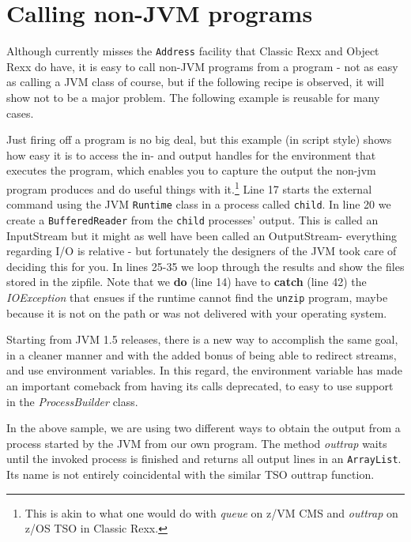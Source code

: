 {\chapter{Calling non-JVM programs}
Although \nr{} currently misses the \texttt{Address} facility that
Classic Rexx and Object Rexx do have, it is easy to call non-JVM programs
from a \nr{} program - not as easy as calling a JVM class of course, but if
the following recipe is observed, it will show not to be a major
problem. The following example is reusable for many cases.
 
Just firing off a program is no big deal, but this example (in script
style) shows how easy it is to access the in- and output handles for
the environment that executes the program, which enables you to
capture the output the non-jvm program produces and do useful things
with it.\footnote{This is akin to what one would do with \emph{queue}
  on z/VM CMS and \emph{outtrap} on z/OS TSO in Classic Rexx.}
Line 17 starts the external command using the JVM \texttt{Runtime}
class in a process called \texttt{child}. In line 20 we create a
\texttt{BufferedReader} from the \texttt{child} processes'
output. This is called an InputStream but it might as well have been
called an OutputStream- everything regarding I/O is relative - but
fortunately the designers of the JVM took care of deciding this for you.
In lines 25-35 we loop through the results and show the files stored
in the zipfile. Note that we \textbf{do} (line 14) have to \textbf{catch} (line
42) the \emph{IOException} that ensues if the runtime cannot find the
\texttt{unzip} program, maybe because it is not on the path or was not
delivered with your operating system. 



Starting from JVM 1.5 releases, there is a new way to accomplish the
same goal, in a cleaner manner and with the added bonus of being able
to redirect streams, and use environment variables. In this regard,
the environment variable has made an important comeback from having
its calls deprecated, to easy to use support in the
\emph{ProcessBuilder} class. 
 
In the above sample, we are using two different ways to obtain the
output from a process started by the JVM from our own program. The
method \emph{outtrap} waits until the invoked process is finished and
returns all output lines in an \texttt{ArrayList}. Its name is not
entirely coincidental with the similar TSO outtrap function. 

}
